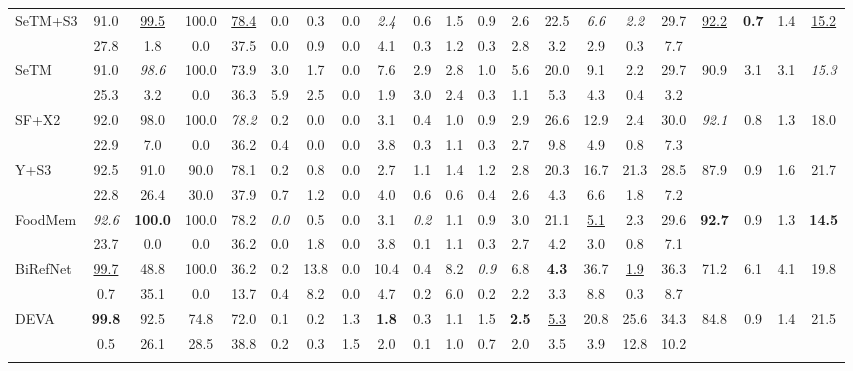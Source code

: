 \documentclass[preprint,12pt]{elsarticle}
\begin{document}
\begin{table}[!htb]
\begin{tabular}{lcccccccccccccccccccc}
SeTM+S3 & 91.0 & \uline{99.5} & 100.0 & \uline{78.4} & 0.0 & 0.3 & 0.0 & \textit{2.4} & 0.6 & 1.5 & 0.9 & 2.6 & 22.5 & \textit{6.6} & \textit{2.2} & 29.7 & \uline{92.2} & \textbf{0.7} & 1.4 & \uline{15.2} \\
  & 27.8 & 1.8 & 0.0 & 37.5 & 0.0 & 0.9 & 0.0 & 4.1 & 0.3 & 1.2 & 0.3 & 2.8 & 3.2 & 2.9 & 0.3 & 7.7 &  &  &  &  \\ \addlinespace[2pt]
\rowcolor{gray!12}
SeTM & 91.0 & \textit{98.6} & 100.0 & 73.9 & 3.0 & 1.7 & 0.0 & 7.6 & 2.9 & 2.8 & 1.0 & 5.6 & 20.0 & 9.1 & 2.2 & 29.7 & 90.9 & 3.1 & 3.1 & \textit{15.3} \\
  & 25.3 & 3.2 & 0.0 & 36.3 & 5.9 & 2.5 & 0.0 & 1.9 & 3.0 & 2.4 & 0.3 & 1.1 & 5.3 & 4.3 & 0.4 & 3.2 &  &  &  &  \\ \addlinespace[2pt]
SF+X2 & 92.0 & 98.0 & 100.0 & \textit{78.2} & 0.2 & 0.0 & 0.0 & 3.1 & 0.4 & 1.0 & 0.9 & 2.9 & 26.6 & 12.9 & 2.4 & 30.0 & \textit{92.1} & 0.8 & 1.3 & 18.0 \\
  & 22.9 & 7.0 & 0.0 & 36.2 & 0.4 & 0.0 & 0.0 & 3.8 & 0.3 & 1.1 & 0.3 & 2.7 & 9.8 & 4.9 & 0.8 & 7.3 &  &  &  &  \\ \addlinespace[2pt]
\rowcolor{gray!12}
Y+S3 & 92.5 & 91.0 & 90.0 & 78.1 & 0.2 & 0.8 & 0.0 & 2.7 & 1.1 & 1.4 & 1.2 & 2.8 & 20.3 & 16.7 & 21.3 & 28.5 & 87.9 & 0.9 & 1.6 & 21.7 \\
  & 22.8 & 26.4 & 30.0 & 37.9 & 0.7 & 1.2 & 0.0 & 4.0 & 0.6 & 0.6 & 0.4 & 2.6 & 4.3 & 6.6 & 1.8 & 7.2 &  &  &  &  \\ \addlinespace[2pt]
FoodMem & \textit{92.6} & \textbf{100.0} & 100.0 & 78.2 & \textit{0.0} & 0.5 & 0.0 & 3.1 & \textit{0.2} & 1.1 & 0.9 & 3.0 & 21.1 & \uline{5.1} & 2.3 & 29.6 & \textbf{92.7} & 0.9 & 1.3 & \textbf{14.5} \\
  & 23.7 & 0.0 & 0.0 & 36.2 & 0.0 & 1.8 & 0.0 & 3.8 & 0.1 & 1.1 & 0.3 & 2.7 & 4.2 & 3.0 & 0.8 & 7.1 &  &  &  &  \\ \addlinespace[2pt]
\rowcolor{gray!12}
BiRefNet & \uline{99.7} & 48.8 & 100.0 & 36.2 & 0.2 & 13.8 & 0.0 & 10.4 & 0.4 & 8.2 & \textit{0.9} & 6.8 & \textbf{4.3} & 36.7 & \uline{1.9} & 36.3 & 71.2 & 6.1 & 4.1 & 19.8 \\
  & 0.7 & 35.1 & 0.0 & 13.7 & 0.4 & 8.2 & 0.0 & 4.7 & 0.2 & 6.0 & 0.2 & 2.2 & 3.3 & 8.8 & 0.3 & 8.7 &  &  &  &  \\ \addlinespace[2pt]
DEVA & \textbf{99.8} & 92.5 & 74.8 & 72.0 & 0.1 & 0.2 & 1.3 & \textbf{1.8} & 0.3 & 1.1 & 1.5 & \textbf{2.5} & \uline{5.3} & 20.8 & 25.6 & 34.3 & 84.8 & 0.9 & 1.4 & 21.5 \\
  & 0.5 & 26.1 & 28.5 & 38.8 & 0.2 & 0.3 & 1.5 & 2.0 & 0.1 & 1.0 & 0.7 & 2.0 & 3.5 & 3.9 & 12.8 & 10.2 &  &  &  &  \\ \addlinespace[2pt]


\end{tabular}
\end{table}
\end{document}
